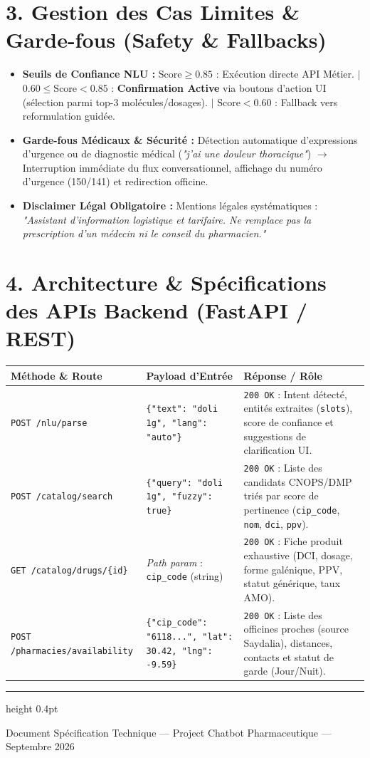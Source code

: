 \documentclass[10pt,a4paper]{article}
\begin{document}
\section*{3. Gestion des Cas Limites \& Garde-fous (Safety \& Fallbacks)}
\begin{itemize}
    \item \textbf{Seuils de Confiance NLU :} 
    $\text{Score} \ge 0.85$ : Exécution directe API Métier. $|$ $0.60 \le \text{Score} < 0.85$ : \textbf{Confirmation Active} via boutons d'action UI (sélection parmi top-3 molécules/dosages). $|$ $\text{Score} < 0.60$ : Fallback vers reformulation guidée.
    \item \textbf{Garde-fous Médicaux \& Sécurité :} Détection automatique d'expressions d'urgence ou de diagnostic médical (\textit{"j'ai une douleur thoracique"}) $\rightarrow$ Interruption immédiate du flux conversationnel, affichage du numéro d'urgence (150/141) et redirection officine.
    \item \textbf{Disclaimer Légal Obligatoire :} Mentions légales systématiques : \textit{"Assistant d'information logistique et tarifaire. Ne remplace pas la prescription d'un médecin ni le conseil du pharmacien."}
\end{itemize}

\section*{4. Architecture \& Spécifications des APIs Backend (FastAPI / REST)}
\renewcommand{\arraystretch}{1.25}
\begin{small}
\begin{tabularx}{\textwidth}{@{}l p{3.8cm} X@{}}
\toprule
\textbf{Méthode \& Route} & \textbf{Payload d'Entrée} & \textbf{Réponse / Rôle} \\
\midrule
\texttt{POST /nlu/parse} & \texttt{\{"text": "doli 1g", "lang": "auto"\}} & \texttt{200 OK} : Intent détecté, entités extraites (\texttt{slots}), score de confiance et suggestions de clarification UI. \\
\texttt{POST /catalog/search} & \texttt{\{"query": "doli 1g", "fuzzy": true\}} & \texttt{200 OK} : Liste des candidats CNOPS/DMP triés par score de pertinence (\texttt{cip\_code}, \texttt{nom}, \texttt{dci}, \texttt{ppv}). \\
\texttt{GET /catalog/drugs/\{id\}} & \textit{Path param} : \texttt{cip\_code} (string) & \texttt{200 OK} : Fiche produit exhaustive (DCI, dosage, forme galénique, PPV, statut générique, taux AMO). \\
\texttt{POST /pharmacies/availability} & \texttt{\{"cip\_code": "6118...", "lat": 30.42, "lng": -9.59\}} & \texttt{200 OK} : Liste des officines proches (source Saydalia), distances, contacts et statut de garde (Jour/Nuit). \\
\bottomrule
\end{tabularx}
\end{small}

\vfill
\hrule height 0.4pt
\vspace{2pt}
\begin{center}
    {\tiny \color{darktext} Document Spécification Technique --- Project Chatbot Pharmaceutique --- Septembre 2026}
\end{center}
\end{document}
